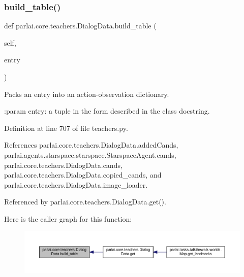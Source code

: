 \subsubsection{\texorpdfstring{build\+\_\+table()}{build\_table()}}
{\footnotesize\ttfamily def parlai.\+core.\+teachers.\+Dialog\+Data.\+build\+\_\+table (\begin{DoxyParamCaption}\item[{}]{self,  }\item[{}]{entry }\end{DoxyParamCaption})}

\begin{DoxyVerb}Packs an entry into an action-observation dictionary.

:param entry: a tuple in the form described in the class docstring.
\end{DoxyVerb}
 

Definition at line 707 of file teachers.\+py.



References parlai.\+core.\+teachers.\+Dialog\+Data.\+added\+Cands, parlai.\+agents.\+starspace.\+starspace.\+Starspace\+Agent.\+cands, parlai.\+core.\+teachers.\+Dialog\+Data.\+cands, parlai.\+core.\+teachers.\+Dialog\+Data.\+copied\+\_\+cands, and parlai.\+core.\+teachers.\+Dialog\+Data.\+image\+\_\+loader.



Referenced by parlai.\+core.\+teachers.\+Dialog\+Data.\+get().

Here is the caller graph for this function\+:
\nopagebreak
\begin{figure}[H]
\begin{center}
\leavevmode
\includegraphics[width=350pt]{classparlai_1_1core_1_1teachers_1_1DialogData_a467bf261c35da2f5d2a34949281d2669_icgraph}
\end{center}
\end{figure}
\mbox{\label{classparlai_1_1core_1_1teachers_1_1DialogData_a1e037df2f18a67503db657ae4cc27ab4}} 
